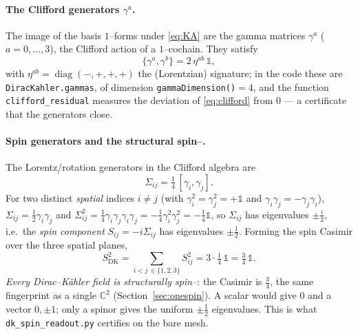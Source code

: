 \documentclass[11pt,oneside]{article}
\newcommand{\C}{\mathbb{C}}
\newcommand{\halff}{\tfrac{1}{2}}
\newcommand{\id}{\mathbb{1}}
\newcommand{\code}[1]{\texttt{#1}}
\begin{document}
\paragraph{The Clifford generators $\gamma^a$.}
The image of the basis $1$--forms under \eqref{eq:KA} are the gamma matrices
$\gamma^a$ ($a=0,\dots,3$), the Clifford action of a $1$--cochain. They satisfy
\begin{equation}
  \{\gamma^a,\gamma^b\} = 2\,\eta^{ab}\,\id ,
  \label{eq:clifford}
\end{equation}
with $\eta^{ab}=\operatorname{diag}(-,+,+,+)$ the (Lorentzian) signature; in the
code these are \code{DiracKahler.gammas}, of dimension
\code{gammaDimension()}$=4$, and the function \code{clifford\_residual} measures
the deviation of \eqref{eq:clifford} from $0$ --- a certificate that the
generators close.

\paragraph{Spin generators and the structural spin--\textonehalf.}
The Lorentz/rotation generators in the Clifford algebra are
\begin{equation}
  \boxed{\,\Sigma_{ij} = \tfrac14\,[\gamma_i,\gamma_j].\,}
  \label{eq:Sigma}
\end{equation}
For two distinct \emph{spatial} indices $i\neq j$ (with
$\gamma_i^2=\gamma_j^2=+\id$ and $\gamma_i\gamma_j=-\gamma_j\gamma_i$),
$\Sigma_{ij}=\halff\gamma_i\gamma_j$ and
$\Sigma_{ij}^2 = \tfrac14\gamma_i\gamma_j\gamma_i\gamma_j
= -\tfrac14\gamma_i^2\gamma_j^2 = -\tfrac14\id$, so $\Sigma_{ij}$ has
eigenvalues $\pm\tfrac{i}{2}$, i.e.\ the \emph{spin component}
$S_{ij}=-i\Sigma_{ij}$ has eigenvalues $\pm\tfrac12$. Forming the spin Casimir
over the three spatial planes,
\begin{equation}
  S^2_{\text{DK}} = \sum_{i<j\,\in\{1,2,3\}} S_{ij}^2
                  = 3\cdot\tfrac14\,\id = \tfrac34\,\id .
  \label{eq:dkcasimir}
\end{equation}
\emph{Every Dirac--K\"ahler field is structurally spin--\textonehalf}: the
Casimir is $\tfrac34$, the same fingerprint as a single $\C^2$
(Section~\ref{sec:onespin}). A scalar would give $0$ and a vector $0,\pm1$; only
a spinor gives the uniform $\pm\tfrac12$ eigenvalues. This is what
\code{dk\_spin\_readout.py} certifies on the bare mesh.
\end{document}
